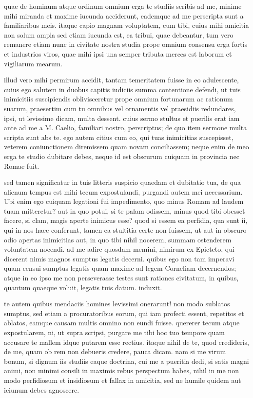  quae de hominum atque ordinum omnium erga te studiis scribis ad me, minime mihi miranda et maxime iucunda acciderunt, eademque ad me perscripta sunt a familiaribus meis. itaque capio magnam voluptatem, cum tibi, cuius mihi amicitia non solum ampla sed etiam iucunda est, ea tribui, quae debeantur, tum vero remanere etiam nunc in civitate nostra studia prope omnium consensu erga fortis et industrios viros, quae mihi ipsi una semper tributa merces est laborum et vigiliarum mearum.

 illud vero mihi permirum accidit, tantam temeritatem fuisse in eo adulescente, cuius ego salutem in duobus capitis iudiciis summa contentione defendi, ut tuis inimicitiis suscipiendis oblivisceretur prope omnium fortunarum ac rationum suarum, praesertim cum tu omnibus vel ornamentis vel praesidiis redundares, ipsi, ut levissime dicam, multa dessent. cuius sermo stultus et puerilis erat iam ante ad me a M. Caelio, familiari nostro, perscriptus; de quo item sermone multa scripta sunt abs te. ego autem citius cum eo, qui tuas inimicitias suscepisset, veterem coniunctionem diremissem quam novam conciliassem; neque enim de meo erga te studio dubitare debes, neque id est obscurum cuiquam in provincia nec Romae fuit.

 sed tamen significatur in tuis litteris suspicio quaedam et dubitatio tua, de qua alienum tempus est mihi tecum expostulandi, purgandi autem mei necessarium. Ubi enim ego cuiquam legationi fui impedimento, quo minus Romam ad laudem tuam mitteretur? aut in quo potui, si te palam odissem, minus quod tibi obesset facere, si clam, magis aperte inimicus esse? quod si essem ea perfidia, qua sunt ii, qui in nos haec conferunt, tamen ea stultitia certe non fuissem, ut aut in obscuro odio apertas inimicitias aut, in quo tibi nihil nocerem, summam ostenderem voluntatem nocendi. ad me adire quosdam memini, nimirum ex Epicteto, qui dicerent nimis magnos sumptus legatis decerni. quibus ego non tam imperavi quam censui sumptus legatis quam maxime ad legem Corneliam decernendos; atque in eo ipso me non perseverasse testes sunt rationes civitatum, in quibus, quantum quaeque voluit, legatis tuis datum. induxit.

 te autem quibus mendaciis homines levissimi onerarunt! non modo sublatos sumptus, sed etiam a procuratoribus eorum, qui iam profecti essent, repetitos et ablatos, eamque causam multis omnino non eundi fuisse. quererer tecum atque expostularem, ni, ut supra scripsi, purgare me tibi hoc tuo tempore quam accusare te mallem idque putarem esse rectius. itaque nihil de te, quod credideris, de me, quam ob rem non debueris credere, pauca dicam. nam si me virum bonum, si dignum iis studiis eaque doctrina, cui me a pueritia dedi, si satis magni animi, non minimi consili in maximis rebus perspectum habes, nihil in me non modo perfidiosum et insidiosum et fallax in amicitia, sed ne humile quidem aut ieiunum debes agnoscere.

